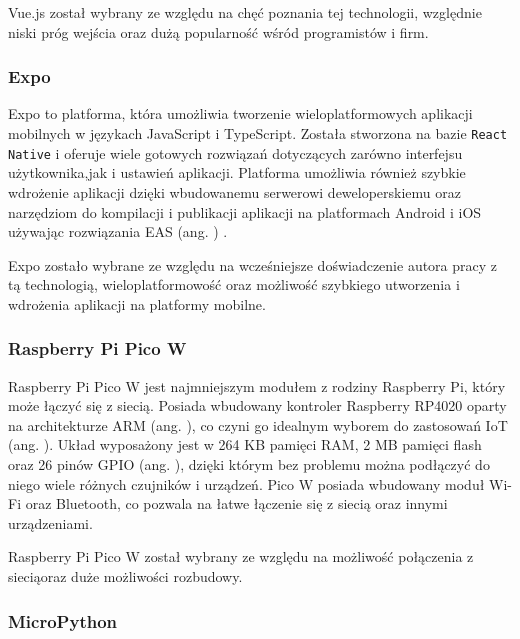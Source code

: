 Vue.js został wybrany ze względu na chęć poznania tej technologii, względnie niski próg wejścia oraz dużą popularność wśród programistów i firm.

\subsubsection*{Expo}

Expo \cite{bib:expo} to platforma, która umożliwia tworzenie wieloplatformowych aplikacji mobilnych w językach JavaScript i TypeScript. Została stworzona na bazie \texttt{React Native} i oferuje wiele gotowych rozwiązań dotyczących zarówno interfejsu użytkownika,\linebreak jak i ustawień aplikacji. Platforma umożliwia również szybkie wdrożenie aplikacji dzięki wbudowanemu serwerowi deweloperskiemu oraz narzędziom do kompilacji i publikacji aplikacji na platformach Android i iOS używając rozwiązania EAS (ang. ) \cite{bib:eas}.

Expo zostało wybrane ze względu na wcześniejsze doświadczenie autora pracy z tą technologią, wieloplatformowość oraz możliwość szybkiego utworzenia i wdrożenia aplikacji na platformy mobilne.

\subsubsection*{Raspberry Pi Pico W}

Raspberry Pi Pico W \cite{bib:picoW} jest najmniejszym modułem z rodziny Raspberry Pi, który może łączyć się z siecią. Posiada wbudowany kontroler Raspberry RP4020 oparty na architekturze ARM (ang. ), co czyni go idealnym wyborem do zastosowań IoT (ang. ). Układ wyposażony jest w 264 KB pamięci RAM, 2 MB pamięci flash oraz 26 pinów GPIO (ang. ), dzięki którym bez problemu można podłączyć do niego wiele różnych czujników i urządzeń. Pico W posiada wbudowany moduł Wi-Fi oraz Bluetooth, co pozwala na łatwe łączenie się z siecią oraz innymi urządzeniami.

Raspberry Pi Pico W został wybrany ze względu na możliwość połączenia z siecią\linebreak oraz duże możliwości rozbudowy.

\subsubsection*{MicroPython}

